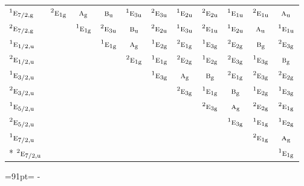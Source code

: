 \documentclass[10pt,a4paper]{article}
\newcommand{\needspace}[1]{\par\penalty-100\begingroup\dimen0=#1\relax\dimen2=\pagegoal
  \advance\dimen2-\pagetotal\ifdim\dimen0>\dimen2\relax\ifdim\dimen2>0pt\vfil\break\fi\fi
  \endgroup}
\numberwithin{equation}{section}
\newcommand{\irr}[1]{\text{\normalfont\scshape #1}}
\newcommand{\conjpair}[1]{{}^{#1}}
\newcommand{\ptag}[1]{\mathrm{#1}}
\begin{document}
{\begin{longtable}{@{}lcccccccccc@{}}
$\conjpair{1}\irr{e}_{7/2,\ptag{g}}$ & $\conjpair{2}\irr{e}_{1\ptag{g}}$ & $\irr{a}_{\ptag{g}}$ & $\irr{b}_{\ptag{u}}$ & $\conjpair{1}\irr{e}_{3\ptag{u}}$ & $\conjpair{2}\irr{e}_{3\ptag{u}}$ & $\conjpair{1}\irr{e}_{2\ptag{u}}$ & $\conjpair{2}\irr{e}_{2\ptag{u}}$ & $\conjpair{1}\irr{e}_{1\ptag{u}}$ & $\conjpair{2}\irr{e}_{1\ptag{u}}$ & $\irr{a}_{\ptag{u}}$\\
$\conjpair{2}\irr{e}_{7/2,\ptag{g}}$ &  & $\conjpair{1}\irr{e}_{1\ptag{g}}$ & $\conjpair{2}\irr{e}_{3\ptag{u}}$ & $\irr{b}_{\ptag{u}}$ & $\conjpair{2}\irr{e}_{2\ptag{u}}$ & $\conjpair{1}\irr{e}_{3\ptag{u}}$ & $\conjpair{2}\irr{e}_{1\ptag{u}}$ & $\conjpair{1}\irr{e}_{2\ptag{u}}$ & $\irr{a}_{\ptag{u}}$ & $\conjpair{1}\irr{e}_{1\ptag{u}}$\\
$\conjpair{1}\irr{e}_{1/2,\ptag{u}}$ &  &  & $\conjpair{1}\irr{e}_{1\ptag{g}}$ & $\irr{a}_{\ptag{g}}$ & $\conjpair{1}\irr{e}_{2\ptag{g}}$ & $\conjpair{2}\irr{e}_{1\ptag{g}}$ & $\conjpair{1}\irr{e}_{3\ptag{g}}$ & $\conjpair{2}\irr{e}_{2\ptag{g}}$ & $\irr{b}_{\ptag{g}}$ & $\conjpair{2}\irr{e}_{3\ptag{g}}$\\
$\conjpair{2}\irr{e}_{1/2,\ptag{u}}$ &  &  &  & $\conjpair{2}\irr{e}_{1\ptag{g}}$ & $\conjpair{1}\irr{e}_{1\ptag{g}}$ & $\conjpair{2}\irr{e}_{2\ptag{g}}$ & $\conjpair{1}\irr{e}_{2\ptag{g}}$ & $\conjpair{2}\irr{e}_{3\ptag{g}}$ & $\conjpair{1}\irr{e}_{3\ptag{g}}$ & $\irr{b}_{\ptag{g}}$\\
$\conjpair{1}\irr{e}_{3/2,\ptag{u}}$ &  &  &  &  & $\conjpair{1}\irr{e}_{3\ptag{g}}$ & $\irr{a}_{\ptag{g}}$ & $\irr{b}_{\ptag{g}}$ & $\conjpair{2}\irr{e}_{1\ptag{g}}$ & $\conjpair{2}\irr{e}_{3\ptag{g}}$ & $\conjpair{2}\irr{e}_{2\ptag{g}}$\\
$\conjpair{2}\irr{e}_{3/2,\ptag{u}}$ &  &  &  &  &  & $\conjpair{2}\irr{e}_{3\ptag{g}}$ & $\conjpair{1}\irr{e}_{1\ptag{g}}$ & $\irr{b}_{\ptag{g}}$ & $\conjpair{1}\irr{e}_{2\ptag{g}}$ & $\conjpair{1}\irr{e}_{3\ptag{g}}$\\
$\conjpair{1}\irr{e}_{5/2,\ptag{u}}$ &  &  &  &  &  &  & $\conjpair{2}\irr{e}_{3\ptag{g}}$ & $\irr{a}_{\ptag{g}}$ & $\conjpair{2}\irr{e}_{2\ptag{g}}$ & $\conjpair{2}\irr{e}_{1\ptag{g}}$\\
$\conjpair{2}\irr{e}_{5/2,\ptag{u}}$ &  &  &  &  &  &  &  & $\conjpair{1}\irr{e}_{3\ptag{g}}$ & $\conjpair{1}\irr{e}_{1\ptag{g}}$ & $\conjpair{1}\irr{e}_{2\ptag{g}}$\\
$\conjpair{1}\irr{e}_{7/2,\ptag{u}}$ &  &  &  &  &  &  &  &  & $\conjpair{2}\irr{e}_{1\ptag{g}}$ & $\irr{a}_{\ptag{g}}$\\*
$\conjpair{2}\irr{e}_{7/2,\ptag{u}}$ &  &  &  &  &  &  &  &  &  & $\conjpair{1}\irr{e}_{1\ptag{g}}$\\
\bottomrule\end{longtable}}
\needspace{91pt}
\end{document}
